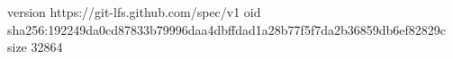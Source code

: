 version https://git-lfs.github.com/spec/v1
oid sha256:192249da0cd87833b79996daa4dbffdad1a28b77f5f7da2b36859db6ef82829c
size 32864
